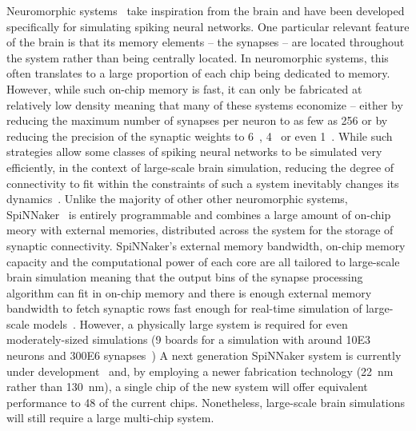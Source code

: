 \documentclass[9pt,twocolumn,twoside,lineno]{pnas-new}
\begin{document}
Neuromorphic systems~\citep{Frenkel2018,Frenkel2019,Furber2014,Merolla2014,Qiao2015,Schemmel2017} take inspiration from the brain and have been developed specifically for simulating spiking neural networks.
One particular relevant feature of the brain is that its memory elements -- the synapses -- are located throughout the system rather than being centrally located.
In neuromorphic systems, this often translates to a large proportion of each chip being dedicated to memory.
However, while such on-chip memory is fast, it can only be fabricated at relatively low density meaning that many of these systems economize -- either by reducing the maximum number of synapses per neuron to as few as \num{256} or by reducing the precision of the synaptic weights to \num{6}~\citep{Schemmel2017}, \num{4}~\citep{Frenkel2018} or even \SI{1}{\bit}~\citep{Merolla2014,Frenkel2019}.
While such strategies allow some classes of spiking neural networks to be simulated very efficiently, in the context of large-scale brain simulation, reducing the degree of connectivity to fit within the constraints of such a system inevitably changes its dynamics~\citep{VanAlbada2015}.
Unlike the majority of other other neuromorphic systems, SpiNNaker~\citep{Furber2014} is entirely programmable and combines a large amount of on-chip meory with external memories, distributed across the system for the storage of synaptic connectivity.
SpiNNaker's external memory bandwidth, on-chip memory capacity and the computational power of each core are all tailored to large-scale brain simulation meaning that the output bins of the synapse processing algorithm can fit in on-chip memory and there is enough external memory bandwidth to fetch synaptic rows fast enough for real-time simulation of large-scale models~\citep{Rhodes2019}.
However, a physically large system is required for even moderately-sized simulations (9 boards for a simulation with around \num{10E3} neurons and \num{300E6} synapses~\citep{Rhodes2019})
A next generation SpiNNaker system is currently under development~\citep{Mayr2019} and, by employing a newer fabrication technology (\SI{22}{\nano\meter} rather than \SI{130}{\nano\meter}), a single chip of the new system will offer equivalent performance to 48 of the current chips.
Nonetheless, large-scale brain simulations will still require a large multi-chip system.
\end{document}
